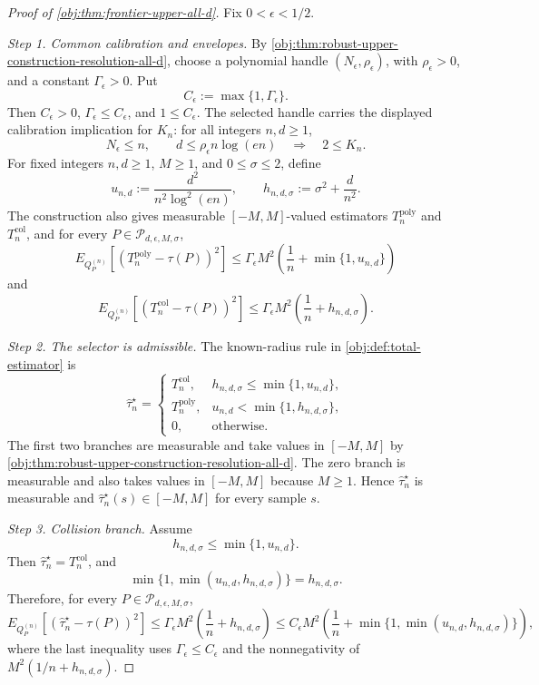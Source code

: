 \begin{proof}[Proof of \cref{obj:thm:frontier-upper-all-d}]
Fix \(0<\epsilon<1/2\).

\emph{Step 1. Common calibration and envelopes.}
By \cref{obj:thm:robust-upper-construction-resolution-all-d}, choose a polynomial handle
\((N_{\epsilon},\rho_{\epsilon})\), with \(\rho_{\epsilon}>0\), and a constant
\(\Gamma_{\epsilon}>0\).  Put
\[
C_{\epsilon}:=\max\{1,\Gamma_{\epsilon}\}.
\]
Then \(C_{\epsilon}>0\), \(\Gamma_{\epsilon}\le C_{\epsilon}\), and
\(1\le C_{\epsilon}\).  The selected handle carries the displayed calibration implication
for \(K_n\): for all integers \(n,d\ge1\),
\[
N_{\epsilon}\le n,
\qquad
d\le \rho_{\epsilon}n\log(en)
\quad\Longrightarrow\quad
2\le K_n .
\]
For fixed integers \(n,d\ge1\), \(M\ge1\), and \(0\le\sigma\le2\), define
\[
u_{n,d}:=\frac{d^2}{n^2\log^2(en)},
\qquad
h_{n,d,\sigma}:=\sigma^2+\frac{d}{n^2}.
\]
The construction also gives measurable \([-M,M]\)-valued estimators
\(T_n^{\mathrm{poly}}\) and \(T_n^{\mathrm{col}}\), and for every
\(P\in\mathcal P_{d,\epsilon,M,\sigma}\),
\[
E_{Q_P^{(n)}}\!\left[
\left(T_n^{\mathrm{poly}}-\tau(P)\right)^2
\right]
\le
\Gamma_{\epsilon}M^2
\left(\frac1n+\min\{1,u_{n,d}\}\right)
\]
and
\[
E_{Q_P^{(n)}}\!\left[
\left(T_n^{\mathrm{col}}-\tau(P)\right)^2
\right]
\le
\Gamma_{\epsilon}M^2
\left(\frac1n+h_{n,d,\sigma}\right).
\] %

\emph{Step 2. The selector is admissible.}
The known-radius rule in \cref{obj:def:total-estimator} is
\[
\widehat\tau_n^{\star}
=
\begin{cases}
T_n^{\mathrm{col}},&
h_{n,d,\sigma}\le \min\{1,u_{n,d}\},\\
T_n^{\mathrm{poly}},&
u_{n,d}<\min\{1,h_{n,d,\sigma}\},\\
0,&\text{otherwise}.
\end{cases}
\]
The first two branches are measurable and take values in \([-M,M]\) by
\cref{obj:thm:robust-upper-construction-resolution-all-d}.  The zero branch is measurable and
also takes values in \([-M,M]\) because \(M\ge1\).  Hence
\(\widehat\tau_n^{\star}\) is measurable and
\(\widehat\tau_n^{\star}(s)\in[-M,M]\) for every sample \(s\). %

\emph{Step 3. Collision branch.}
Assume
\[
h_{n,d,\sigma}\le \min\{1,u_{n,d}\}.
\]
Then \(\widehat\tau_n^{\star}=T_n^{\mathrm{col}}\), and
\[
\min\{1,\min(u_{n,d},h_{n,d,\sigma})\}=h_{n,d,\sigma}.
\]
Therefore, for every \(P\in\mathcal P_{d,\epsilon,M,\sigma}\),
\[
E_{Q_P^{(n)}}\!\left[
\left(\widehat\tau_n^{\star}-\tau(P)\right)^2
\right]
\le
\Gamma_{\epsilon}M^2
\left(\frac1n+h_{n,d,\sigma}\right)
\le
C_{\epsilon}M^2
\left(\frac1n+\min\{1,\min(u_{n,d},h_{n,d,\sigma})\}\right),
\]
where the last inequality uses \(\Gamma_{\epsilon}\le C_{\epsilon}\) and the
nonnegativity of \(M^2(1/n+h_{n,d,\sigma})\). %


\end{proof}
